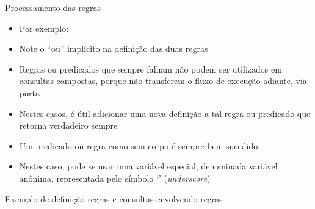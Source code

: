 \begin{frame}[fragile]{Processamento das regras}

    \begin{itemize}
        \item Por exemplo:


        \item Note o ``ou'' implícito na definição das duas regras

        \item Regras ou predicados que sempre falham não podem ser utilizados em consultas 
            compostas, porque não transferem o fluxo de execução adiante, via porta 

        \item Nestes casos, é útil adicionar uma nova definição a tal regra ou predicado que 
            retorna verdadeiro sempre

        \item Um predicado ou regra como sem corpo é sempre bem sucedido

        \item Nestes caso, pode se usar uma variável especial, denominada variável anônima,
            representada pelo símbolo `' (\textit{underscore})

    \end{itemize}

\end{frame}


\begin{frame}[fragile]{Exemplo de definição regras e consultas envolvendo regras}


\end{frame}

